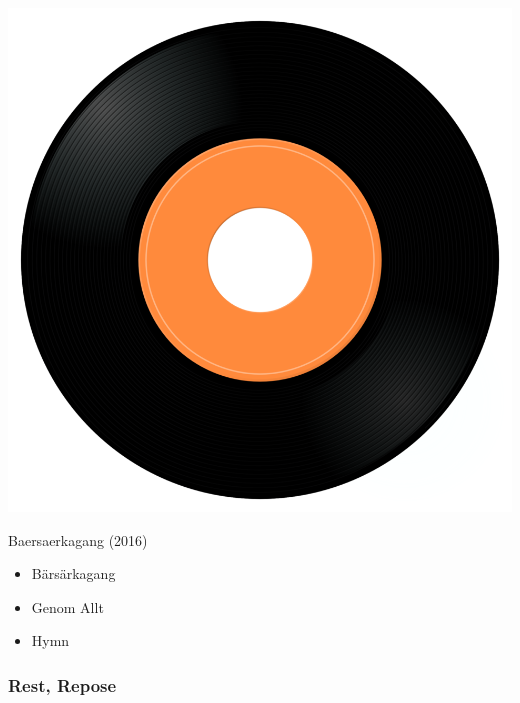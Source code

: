 \begin{minipage}[t]{0.25\textwidth}
\captionsetup{type=figure}
\includegraphics[width=\textwidth]{Images/cover.png}
\caption*{Baersaerkagang (2016)}
\end{minipage}
\begin{minipage}[t]{0.25\textwidth}\vspace{0pt}
\begin{itemize}[nosep,leftmargin=1em,labelwidth=*,align=left]
	\setlength{\itemsep}{0pt}
	\item Bärsärkagang
	\item Genom Allt 
	\item Hymn
\end{itemize}
\end{minipage}

\subsubsection{Rest, Repose}

